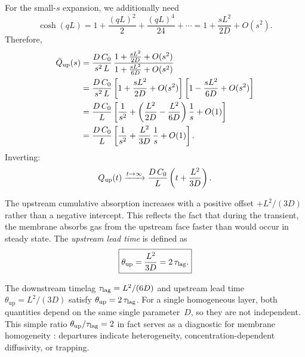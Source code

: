 For the small-$s$ expansion, we additionally need
\begin{equation}
  \cosh(qL) = 1 + \frac{(qL)^2}{2} + \frac{(qL)^4}{24} + \cdots
  = 1 + \frac{sL^2}{2D} + O(s^2).
\end{equation}
Therefore,
\begin{align}
  \bar{Q}_{\mathrm{up}}(s)
  &= \frac{D\,C_0}{s^2\,L}\,
    \frac{1 + \frac{sL^2}{2D} + O(s^2)}{1 + \frac{sL^2}{6D} + O(s^2)}
  \notag\\
  &= \frac{D\,C_0}{s^2\,L}
    \left[1 + \frac{sL^2}{2D} + O(s^2)\right]
    \left[1 - \frac{sL^2}{6D} + O(s^2)\right]
  \notag\\
  &= \frac{D\,C_0}{L}\left[\frac{1}{s^2}
    + \left(\frac{L^2}{2D} - \frac{L^2}{6D}\right)\frac{1}{s}
    + O(1)\right]
  \notag\\
  &= \frac{D\,C_0}{L}\left[\frac{1}{s^2}
    + \frac{L^2}{3D}\,\frac{1}{s} + O(1)\right].
\end{align}
Inverting:
\begin{equation}
  \label{eq:single-Qup-asymptote}
  Q_{\mathrm{up}}(t) \xrightarrow{t\to\infty}
  \frac{D\,C_0}{L}\left(t + \frac{L^2}{3D}\right).
\end{equation}

\begin{remark}
The upstream cumulative absorption increases with a positive offset
$+L^2/(3D)$ rather than a negative intercept.  This reflects the fact that
during the transient, the membrane absorbs gas from the upstream face faster
than would occur in steady state.  The \emph{upstream lead time} is defined as
\begin{equation}
  \label{eq:upstream-lead-time}
  \boxed{\theta_{\mathrm{up}} = \frac{L^2}{3D} = 2\,\tau_{\mathrm{lag}}.}
\end{equation}
\end{remark}

\begin{remark}
\label{rem:up-vs-down}
The downstream timelag $\tau_{\mathrm{lag}} = L^2/(6D)$ and upstream lead time
$\theta_{\mathrm{up}} = L^2/(3D)$ satisfy $\theta_{\mathrm{up}} = 2\,\tau_{\mathrm{lag}}$.
For a single homogeneous layer, both quantities depend on the same single
parameter~$D$, so they are not independent.  This simple ratio
$\theta_{\mathrm{up}}/\tau_{\mathrm{lag}} = 2$ in fact serves as a diagnostic for membrane
homogeneity \cite{Petropoulos1973,Crank1975}: departures indicate
heterogeneity, concentration-dependent diffusivity, or trapping.
\end{remark}
